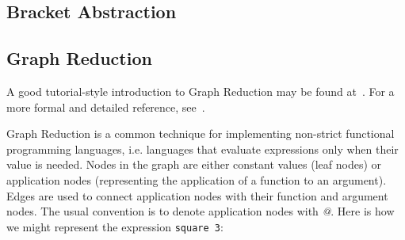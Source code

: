 \documentclass[conference]{IEEEtran}
\begin{document}
%
%
%
%
%
\subsection{Bracket Abstraction}

\subsection{Graph Reduction}
A good tutorial-style introduction to Graph Reduction may be found at~\cite{peyton_jones_implementing_2000}.
For a more formal and detailed reference, see~\cite{spj_impl}.

Graph Reduction is a common technique for implementing non-strict functional programming languages, i.e. languages that evaluate expressions only when their value is needed.
Nodes in the graph are either constant values (leaf nodes) or application nodes (representing the application of a function to an argument).
Edges are used to connect application nodes with their function and argument nodes.
The usual convention is to denote application nodes with \emph{@}.
Here is how we might represent the expression \texttt{square 3}:
\end{document}
